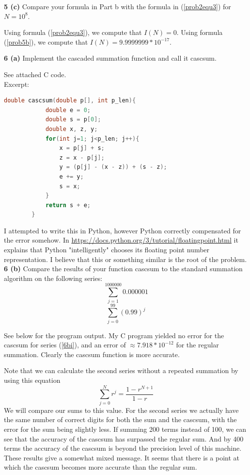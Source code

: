 \documentclass[12pt]{article}
\begin{document}
\hspace{-7 ex}\textbf{5 (c)} Compare your formula in Part b with the formula in (\ref{prob2equ3}) for $N = 10^8$. \bigbreak

	Using formula (\ref{prob2equ3}), we compute that $I(N) = 0$. Using formula (\ref{prob5b}), we compute that $I(N) = 9.9999999*10^{-17}$. \bigbreak


\hspace{-7 ex}\textbf{6 (a)} Implement the cascaded summation function and call it cascsum. \bigbreak

	See attached C code. \\
	Excerpt: \\

	\begin{lstlisting}[language=C]
		double cascsum(double p[], int p_len){
			double e = 0;
			double s = p[0];
			double x, z, y;
			for(int j=1; j<p_len; j++){
				x = p[j] + s;
				z = x - p[j];
				y = (p[j] - (x - z)) + (s - z);
				e += y;
				s = x;
			}
			return s + e;
		}
	\end{lstlisting}	
	
	I attempted to write this in Python, however Python correctly compensated for the error somehow. In \url{https://docs.python.org/3/tutorial/floatingpoint.html} it explains that Python "intelligently" chooses its floating point number representation. I believe that this or something similar is the root of the problem.\\

\hspace{-7 ex}\textbf{6 (b)} Compare the results of your function cascsum to the standard summation algorithm on the following series: \\
	\begin{equation}\label{6bi}
		\sum_{j=1}^{1000000}0.000001
	\end{equation}
	\begin{equation}\label{6bii}
		\sum_{j=0}^{99}(0.99)^j
	\end{equation}
	
	\bigbreak
	
	See below for the program output. \bigbreak
	My C program yielded no error for the cascsum for series (\ref{6bi}), and an error of $\approx 7.918*10^{-12}$ for the regular summation. Clearly the cascsum function is more accurate.\bigbreak
	
	Note that we can calculate the second series without a repeated summation by using this equation $$ \sum_{j=0}^{N}r^j = \frac{1-r^{N+1}}{1-r}$$ We will compare our sums to this value. For the second series we actually have the same number of correct digits for both the sum and the  cascsum, with the error for the sum being slightly less. If summing 200 terms instead of 100, we can see that the accuracy of the cascsum has surpassed the regular sum. And by 400 terms the accuracy of the cascsum is beyond the precision level of this machine. These results give a somewhat mixed message. It seems that there is a point at which the cascsum becomes more accurate than the regular sum.\\
	
\end{document}
